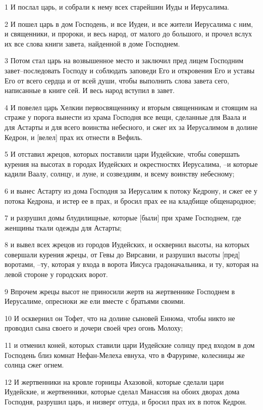 \par 1 И послал царь, и собрали к нему всех старейшин Иуды и Иерусалима.
\par 2 И пошел царь в дом Господень, и все Иудеи, и все жители Иерусалима с ним, и священники, и пророки, и весь народ, от малого до большого, и прочел вслух их все слова книги завета, найденной в доме Господнем.
\par 3 Потом стал царь на возвышенное место и заключил пред лицем Господним завет--последовать Господу и соблюдать заповеди Его и откровения Его и уставы Его от всего сердца и от всей души, чтобы выполнить слова завета сего, написанные в книге сей. И весь народ вступил в завет.
\par 4 И повелел царь Хелкии первосвященнику и вторым священникам и стоящим на страже у порога вынести из храма Господня все вещи, сделанные для Ваала и для Астарты и для всего воинства небесного, и сжег их за Иерусалимом в долине Кедрон, и [велел] прах их отнести в Вефиль.
\par 5 И отставил жрецов, которых поставили цари Иудейские, чтобы совершать курения на высотах в городах Иудейских и окрестностях Иерусалима, --и которые кадили Ваалу, солнцу, и луне, и созвездиям, и всему воинству небесному;
\par 6 и вынес Астарту из дома Господня за Иерусалим к потоку Кедрону, и сжег ее у потока Кедрона, и истер ее в прах, и бросил прах ее на кладбище общенародное;
\par 7 и разрушил домы блудилищные, которые [были] при храме Господнем, где женщины ткали одежды для Астарты;
\par 8 и вывел всех жрецов из городов Иудейских, и осквернил высоты, на которых совершали курения жрецы, от Гевы до Вирсавии, и разрушил высоты [пред] воротами, --ту, которая у входа в ворота Иисуса градоначальника, и ту, которая на левой стороне у городских ворот.
\par 9 Впрочем жрецы высот не приносили жертв на жертвеннике Господнем в Иерусалиме, опресноки же ели вместе с братьями своими.
\par 10 И осквернил он Тофет, что на долине сыновей Еннома, чтобы никто не проводил сына своего и дочери своей чрез огонь Молоху;
\par 11 и отменил коней, которых ставили цари Иудейские солнцу пред входом в дом Господень близ комнат Нефан-Мелеха евнуха, что в Фаруриме, колесницы же солнца сжег огнем.
\par 12 И жертвенники на кровле горницы Ахазовой, которые сделали цари Иудейские, и жертвенники, которые сделал Манассия на обоих дворах дома Господня, разрушил царь, и низверг оттуда, и бросил прах их в поток Кедрон.
